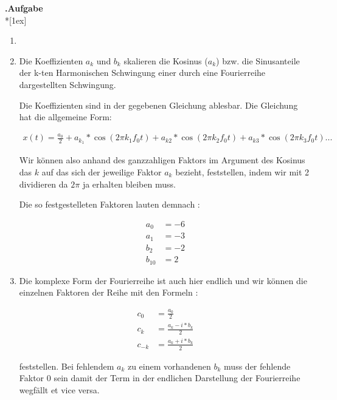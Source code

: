 \documentclass[12pt,a4paper,austrian]{article}
\newcounter{theaufgabe}\setcounter{theaufgabe}{1}
\newenvironment{aufgabe}[1]%
  {\bigskip\par\noindent\begin{nopagebreak}
   \textsf{\textbf{\arabic{theaufgabe}.\thinspace Aufgabe}}\quad
      \textsf{\textit{#1}}\\*[1ex]%
\stepcounter{theaufgabe}\hspace{2ex}\end{nopagebreak}}
  {\par\pagebreak[2]}
\begin{document}
\pagebreak
\begin{aufgabe}{}

\begin{enumerate}
  \item{}
~

\hspace{-3.5cm}
\item Die Koeffizienten $a_k$ und $b_k$ skalieren die Kosinus ($a_k$) bzw. die Sinusanteile der k-ten Harmonischen Schwingung einer durch eine Fourierreihe dargestellten Schwingung.

        Die Koeffizienten sind in der gegebenen Gleichung ablesbar. Die Gleichung hat die allgemeine Form:

        \begin{align*}
            x(t) = \frac{a_0}{2} + a_{k_1}*\cos(2\pi k_1 f_0 t) + a_{k2}*\cos(2\pi k_2 f_0 t) +a_{k3}*\cos(2\pi k_3 f_0 t) ...
        \end{align*}

        Wir können also anhand des ganzzahligen Faktors im Argument des Kosinus das $k$ auf das sich der jeweilige Faktor $a_k$ bezieht, feststellen, indem wir mit 2 dividieren da $2\pi$ ja erhalten bleiben muss.

        Die so festgestelleten Faktoren lauten demnach :

        \begin{align*}
            a_0 &= -6 \\
            a_1 &= -3 \\
            b_2 &= -2 \\
            b_{10} &= 2
        \end{align*}

\item
        Die komplexe Form der Fourierreihe ist auch hier endlich und wir können die einzelnen Faktoren der Reihe mit den Formeln :

        \begin{align*}
            c_0 &= \frac{a_0}{2} \\
            c_k &= \frac{a_k -i* b_k}{2}\\
            c_{-k} &= \frac{a_k +i* b_k}{2}
        \end{align*}

        feststellen. Bei fehlendem $a_k$ zu einem vorhandenen $b_k$ muss der fehlende Faktor 0 sein damit der Term in der endlichen Darstellung der Fourierreihe wegfällt et vice versa.


\end{enumerate}
\end{aufgabe}
\end{document}
